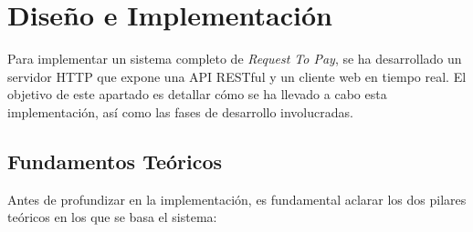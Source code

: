\chapter{Diseño e Implementación}
\label{sec:DisenoImplementacion}
Para implementar un sistema completo de \textit{Request To Pay}, se ha desarrollado un servidor HTTP que expone una API RESTful y un cliente web en tiempo real. El objetivo de este apartado es detallar cómo se ha llevado a cabo esta implementación, así como las fases de desarrollo involucradas.

\section{Fundamentos Teóricos}
Antes de profundizar en la implementación, es fundamental aclarar los dos pilares teóricos en los que se basa el sistema:

